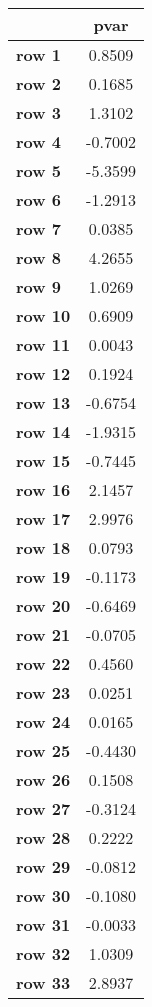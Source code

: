 \documentclass{article}
\begin{document}
{\tiny 
\begin{tabular}{|l|c|}
\hline
& \textbf{pvar} \\ \hline
\textbf{row 1} & 0.8509 \\ \hline
\textbf{row 2} & 0.1685 \\ \hline
\textbf{row 3} & 1.3102 \\ \hline
\textbf{row 4} & -0.7002 \\ \hline
\textbf{row 5} & -5.3599 \\ \hline
\textbf{row 6} & -1.2913 \\ \hline
\textbf{row 7} & 0.0385 \\ \hline
\textbf{row 8} & 4.2655 \\ \hline
\textbf{row 9} & 1.0269 \\ \hline
\textbf{row 10} & 0.6909 \\ \hline
\textbf{row 11} & 0.0043 \\ \hline
\textbf{row 12} & 0.1924 \\ \hline
\textbf{row 13} & -0.6754 \\ \hline
\textbf{row 14} & -1.9315 \\ \hline
\textbf{row 15} & -0.7445 \\ \hline
\textbf{row 16} & 2.1457 \\ \hline
\textbf{row 17} & 2.9976 \\ \hline
\textbf{row 18} & 0.0793 \\ \hline
\textbf{row 19} & -0.1173 \\ \hline
\textbf{row 20} & -0.6469 \\ \hline
\textbf{row 21} & -0.0705 \\ \hline
\textbf{row 22} & 0.4560 \\ \hline
\textbf{row 23} & 0.0251 \\ \hline
\textbf{row 24} & 0.0165 \\ \hline
\textbf{row 25} & -0.4430 \\ \hline
\textbf{row 26} & 0.1508 \\ \hline
\textbf{row 27} & -0.3124 \\ \hline
\textbf{row 28} & 0.2222 \\ \hline
\textbf{row 29} & -0.0812 \\ \hline
\textbf{row 30} & -0.1080 \\ \hline
\textbf{row 31} & -0.0033 \\ \hline
\textbf{row 32} & 1.0309 \\ \hline
\textbf{row 33} & 2.8937 \\ \hline

\end{tabular}}
\end{document}
